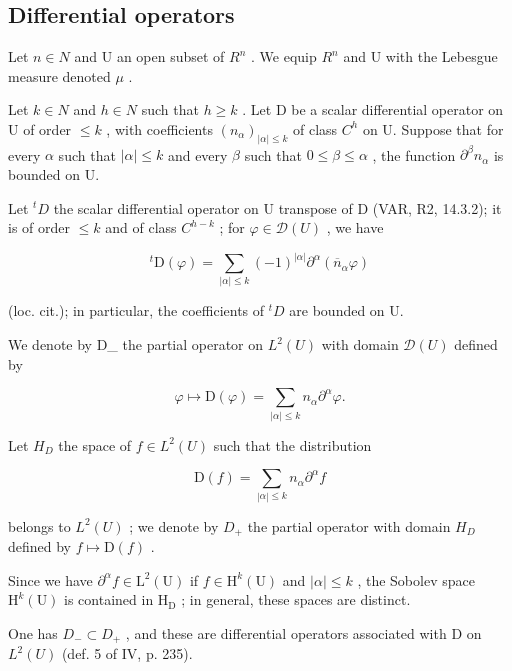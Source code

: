 \subsection{Differential operators}

Let \(n \in N\) and U an open subset of \(R^{n}\) . We equip \(R^{n}\) and U with the Lebesgue measure denoted \(\mu\) .

Let \(k \in N\) and \(h \in N\) such that \(h \geqslant k\) . Let D be a scalar differential operator on U of order \(\leqslant k\) , with coefficients \((n_{\alpha})_{|\alpha| \leqslant k}\) of class \(C^{h}\) on U. Suppose that for every \(\alpha\) such that \(|\alpha| \leqslant k\) and every \(\beta\) such that \(0 \leqslant \beta \leqslant \alpha\) , the function \(\partial^{\beta} n_{\alpha}\) is bounded on U.

Let \({}^{t}D\) the scalar differential operator on U transpose of D (VAR, R2, 14.3.2); it is of order \(\leqslant k\) and of class \(C^{h-k}\) ; for \(\varphi\in\mathcal{D}(U)\) , we have

\[
{ } ^ { t } \mathrm{D} ( \varphi ) = \sum _ { | \alpha | \leqslant k } ( - 1 ) ^ { | \alpha | } \partial ^ { \alpha } ( \overline { { n } } _ { \alpha } \varphi )
\]

(loc. cit.); in particular, the coefficients of \({}^{t}D\) are bounded on U.

We denote by D\_ the partial operator on \(L^{2}(U)\) with domain \(\mathcal{D}(U)\) defined by

\[
\varphi \mapsto \mathrm{D} (\varphi) = \sum_ {| \alpha | \leqslant k} n _ {\alpha} \partial^ {\alpha} \varphi .\tag{5}
\]

Let \(H_{D}\) the space of \(f \in L^{2}(U)\) such that the distribution

\[
\mathrm{D} (f) = \sum_ {| \alpha | \leqslant k} n _ {\alpha} \partial^ {\alpha} f
\]

belongs to \(L^{2}(U)\) ; we denote by \(D_{+}\) the partial operator with domain \(H_{D}\) defined by \(f \mapsto \mathrm{D}(f)\) .

Since we have \(\partial^{\alpha}f\in \mathrm{L}^{2}(\mathrm{U})\) if \(f\in \mathrm{H}^k (\mathrm{U})\) and \(|\alpha |\leqslant k\) , the Sobolev space \(\mathrm{H}^k (\mathrm{U})\) is contained in \(\mathrm{H}_{\mathrm{D}}\) ; in general, these spaces are distinct.

One has \(D_{-} \subset D_{+}\) , and these are differential operators associated with D on \(L^{2}(U)\) (def. 5 of IV, p. 235).

